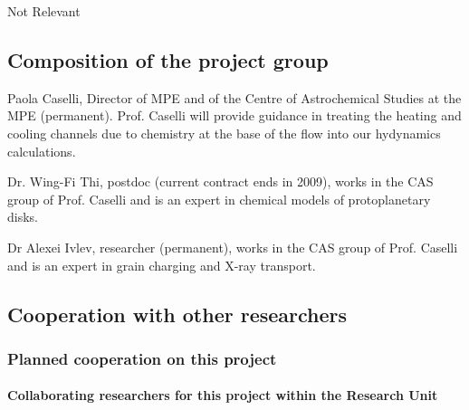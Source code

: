 \documentclass[10pt,fleqn,twoside]{article}
\begin{document}
Not Relevant

\subsection{Composition of the project group}

Paola Caselli, Director of MPE and of the Centre of Astrochemical
Studies at the MPE (permanent). Prof. Caselli will provide guidance in
treating the heating and cooling channels due to chemistry at the base
of the flow into our hydynamics calculations. 

Dr. Wing-Fi Thi, postdoc (current contract ends in 2009), works in the CAS group of Prof. Caselli and
is an expert in chemical models of protoplanetary disks. 

Dr Alexei Ivlev, researcher (permanent), works in the CAS  group of Prof. Caselli and
is an expert in grain charging and X-ray transport. 

\subsection{Cooperation with other researchers}

\subsubsection{Planned cooperation on this project}

\paragraph{Collaborating researchers for this project within the
  Research Unit}
\end{document}
